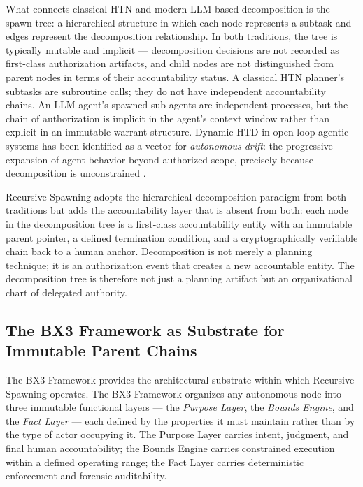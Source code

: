 \documentclass[12pt]{article}
\begin{document}
What connects classical HTN and modern LLM-based decomposition is the spawn tree: a hierarchical structure in which each node represents a subtask and edges represent the decomposition relationship. In both traditions, the tree is typically mutable and implicit --- decomposition decisions are not recorded as first-class authorization artifacts, and child nodes are not distinguished from parent nodes in terms of their accountability status. A classical HTN planner's subtasks are subroutine calls; they do not have independent accountability chains. An LLM agent's spawned sub-agents are independent processes, but the chain of authorization is implicit in the agent's context window rather than explicit in an immutable warrant structure. Dynamic HTD in open-loop agentic systems has been identified as a vector for \emph{autonomous drift}: the progressive expansion of agent behavior beyond authorized scope, precisely because decomposition is unconstrained \cite{autoGPT2023}.

Recursive Spawning adopts the hierarchical decomposition paradigm from both traditions but adds the accountability layer that is absent from both: each node in the decomposition tree is a first-class accountability entity with an immutable parent pointer, a defined termination condition, and a cryptographically verifiable chain back to a human anchor. Decomposition is not merely a planning technique; it is an authorization event that creates a new accountable entity. The decomposition tree is therefore not just a planning artifact but an organizational chart of delegated authority.

\subsection{The BX3 Framework as Substrate for Immutable Parent Chains}

The BX3 Framework \cite{bx3-framework,bx3framework2026} provides the architectural substrate within which Recursive Spawning operates. The BX3 Framework organizes any autonomous node into three immutable functional layers --- the \textit{Purpose Layer}, the \textit{Bounds Engine}, and the \textit{Fact Layer} --- each defined by the properties it must maintain rather than by the type of actor occupying it. The Purpose Layer carries intent, judgment, and final human accountability; the Bounds Engine carries constrained execution within a defined operating range; the Fact Layer carries deterministic enforcement and forensic auditability.
\end{document}
